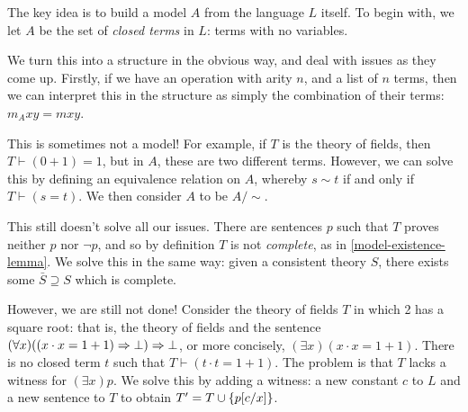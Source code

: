 \documentclass{article}
\begin{document}
\begin{prf}
    The key idea is to build a model $A$ from the language $L$ itself. To begin with, we let $A$ be the set of \textit{closed terms} in $L$: terms with no variables.
    
    We turn this into a structure in the obvious way, and deal with issues as they come up. Firstly, if we have an operation with arity $n$, and a list of $n$ terms, then we can interpret this in the structure as simply the combination of their terms: $m_A xy=mxy$.
    
    This is sometimes not a model! For example, if $T$ is the theory of fields, then $T \vdash (0 + 1) = 1$, but in $A$, these are two different terms. However, we can solve this by defining an equivalence relation on $A$, whereby $s \sim t$ if and only if $T \vdash (s = t)$. We then consider $A$ to be $A/\sim$.
    
    This still doesn't solve all our issues. There are sentences $p$ such that $T$ proves neither $p$ nor $\lnot p$, and so by definition $T$ is not \textit{complete}, as in \ref{model-existence-lemma}. We solve this in the same way: given a consistent theory $S$, there exists some $\bar S \supseteq S$ which is complete.
    
    However, we are still not done! Consider the theory of fields $T$ in which 2 has a square root: that is, the theory of fields and the sentence $(\forall x)((x \cdot x = 1 + 1) \Rightarrow \bot) \Rightarrow \bot$, or more concisely, $(\exists x)(x\cdot x = 1+1)$. There is no closed term $t$ such that $T \vdash (t \cdot t = 1 + 1)$. The problem is that $T$ lacks a witness for $(\exists x)p$. We solve this by adding a witness: a new constant $c$ to $L$ and a new sentence to $T$ to obtain $T' = T \cup \left\lbrace p[c/x] \right\rbrace$.
    

\end{prf}
\end{document}
